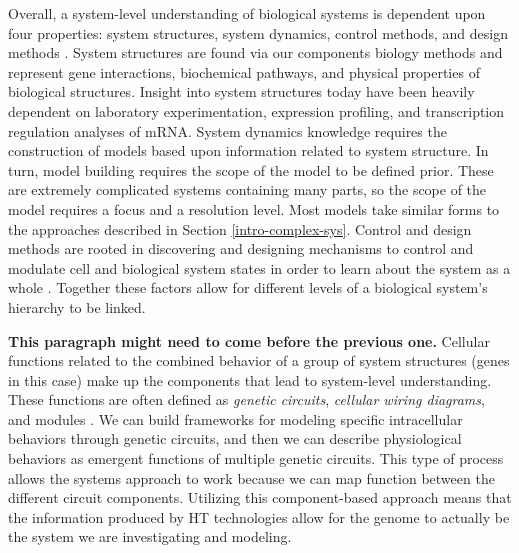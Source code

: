 Overall, a system-level understanding of biological systems is dependent upon four properties: system structures, system dynamics, control methods, and design methods \citep{Kitano2002}. System structures are found via our components biology methods and represent gene interactions, biochemical pathways, and physical properties of biological structures. Insight into system structures today have been heavily dependent on laboratory experimentation, expression profiling, and transcription regulation analyses of \acrfull{mRNA}. System dynamics knowledge requires the construction of models based upon information related to system structure. In turn, model building requires the scope of the model to be defined prior. These are extremely complicated systems containing many parts, so the scope of the model requires a focus and a resolution level. Most models take similar forms to the approaches described in Section \ref{intro-complex-sys}. Control and design methods are rooted in discovering and designing mechanisms to control and modulate cell and biological system states in order to learn about the system as a whole \citep{Kitano2002}. Together these factors allow for different levels of a biological system's hierarchy to be linked. 

\textbf{This paragraph might need to come before the previous one.} Cellular functions related to the combined behavior of a group of system structures (genes in this case) make up the components that lead to system-level understanding. These functions are often defined as \textit{genetic circuits}, \textit{cellular wiring diagrams}, and modules \citep{Palsson2006}. We can build frameworks for modeling specific intracellular behaviors through genetic circuits, and then we can describe physiological behaviors as emergent functions of multiple genetic circuits. This type of process allows the systems approach to work because we can map function between the different circuit components. Utilizing this component-based approach means that the information produced by \acrshort{HT} technologies allow for the genome to actually be the system we are investigating and modeling. 

